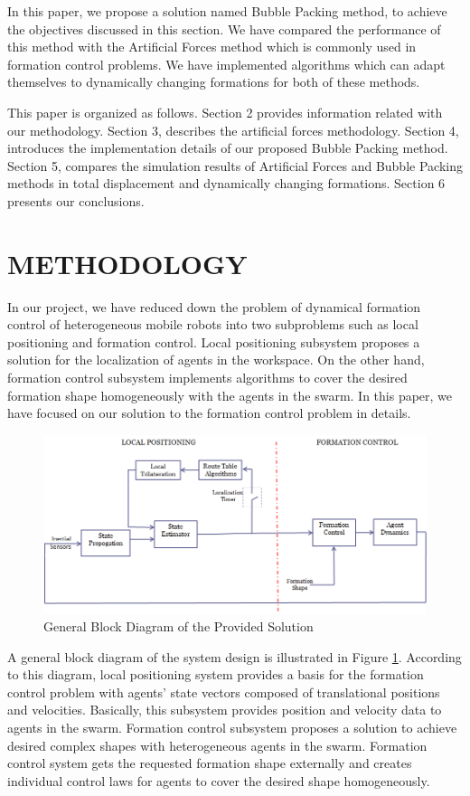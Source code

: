 \documentclass[letterpaper, 10 pt, conference]{ieeeconf}  %
\begin{document}
In this paper, we propose a solution named Bubble Packing method, to achieve the objectives discussed in this section. We have compared the performance of this method with the Artificial Forces method which is commonly used in formation control problems. We have implemented algorithms which can adapt themselves to dynamically changing formations for both of these methods.

This paper is organized as follows. Section 2 provides information related with our methodology. Section 3,  describes the artificial forces methodology. Section 4, introduces the implementation details of our proposed Bubble Packing method. Section 5, compares the simulation results of Artificial Forces and Bubble Packing methods in total displacement and dynamically changing formations. Section 6 presents our conclusions.

\section{METHODOLOGY}
In our project, we have reduced down the problem of dynamical formation control of heterogeneous mobile robots into two subproblems such as local positioning and formation control. Local positioning subsystem proposes a solution for the localization of agents in the workspace. On the other hand, formation control subsystem implements algorithms to cover the desired formation shape homogeneously with the agents in the swarm. In this paper, we have focused on our solution to the formation control problem in details.

\begin{figure}[thpb]
\centering
\includegraphics[scale = 0.35]{general_scheme}
\caption{General Block Diagram of the Provided Solution} \label{general_system}
\end{figure}

A general block diagram of the system design is illustrated in Figure \ref{general_system}. According to this diagram, local positioning system provides a basis for the formation control problem with agents’ state vectors composed of translational positions and velocities. Basically, this subsystem provides position and velocity data to agents in the swarm. Formation control subsystem proposes a solution to achieve desired complex shapes with heterogeneous agents in the swarm. Formation control
system gets the requested formation shape externally and creates individual control laws for agents to cover the desired shape homogeneously. 
\end{document}
